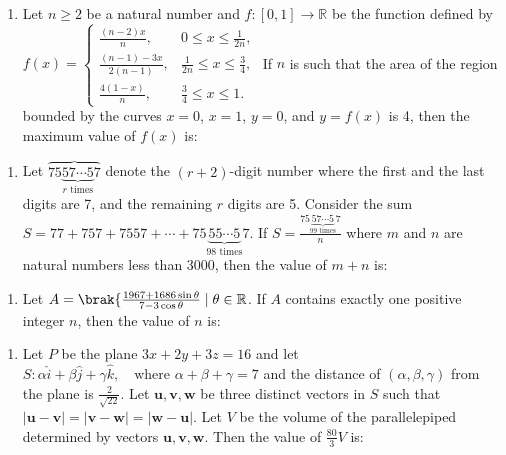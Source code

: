 \documentclass[12pt,a4paper]{article}
\begin{document}
\begin{enumerate}
\begin{enumerate}
\item Let $ n \geq 2 $ be a natural number and $ f :[0,1] \to \mathbb{R} $ be the function defined by
$ f(x) =
\begin{cases} 
\frac{(n-2)x}{n}, & 0 \leq x \leq \frac{1}{2n}, \\ 
\frac{(n-1) - 3x}{2(n-1)}, & \frac{1}{2n} \leq x \leq \frac{3}{4}, \\ 
\frac{4(1-x)}{n}, & \frac{3}{4} \leq x \leq 1.
\end{cases}
$
If $ n $ is such that the area of the region bounded by the curves $ x = 0 $, $ x = 1 $, $ y = 0 $, and $ y = f(x) $ is 4, then the maximum value of $ f(x) $ is:
\end{enumerate}

\begin{enumerate}
\item Let $ \overbrace{75\underbrace{57\cdots5}_{r \text{ times}}7} $ denote the \( (r+2) \)-digit number where the first and the last digits are 7, and the remaining \( r \) digits are 5. Consider the sum $S =77 + 757 + 7557 + \cdots + 75\underbrace{55\cdots5}_{98 \text{ times}}7.$ If $ S = \frac{75\underbrace{57\cdots5}_{99 \text{ times}}7}{n} $ where \( m \) and \( n \) are natural numbers less than 3000, then the value of \( m + n \) is:
\end{enumerate}

\begin{enumerate}
\item Let $ A = \brak\{ \frac{1967 + 1686 \sin \theta}{7 - 3 \cos \theta} \mid \theta \in \mathbb{R}  $. If \( A \) contains exactly one positive integer \( n \), then the value of \( n \) is:
\end{enumerate} 

\begin{enumerate}
\item Let $P$ be the plane $3x + 2y + 3z = 16$ and let 
$
S : \alpha \hat{i} + \beta \hat{j} + \gamma \hat{k}, \quad \text{where } \alpha + \beta + \gamma = 7
$
and the distance of $(\alpha, \beta, \gamma)$ from the plane is $\frac{2}{\sqrt{22}}$.
Let $\mathbf{u}, \mathbf{v}, \mathbf{w}$ be three distinct vectors in $S$ such that $|\mathbf{u} - \mathbf{v}| = |\mathbf{v} - \mathbf{w}| = |\mathbf{w} - \mathbf{u}|$. Let $V$ be the volume of the parallelepiped determined by vectors $\mathbf{u}, \mathbf{v}, \mathbf{w}$. Then the value of $\frac{80}{3} V$ is:
\end{enumerate}


\end{enumerate}
\end{document}
